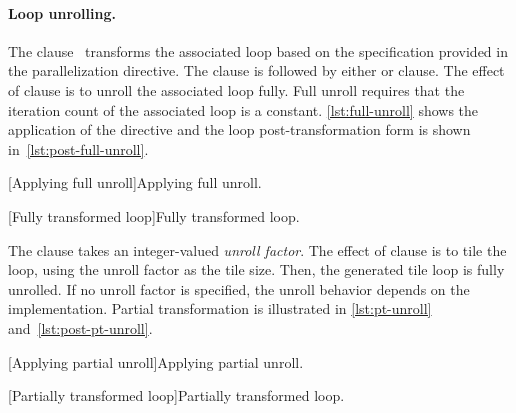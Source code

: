 \paragraph*{Loop unrolling.}
The  clause~\cite[p. 381--382]{openmp_api}
transforms the associated loop based on the specification provided in the parallelization directive.
The  clause is followed by either  or  clause.
The effect of  clause is to unroll the associated loop fully.
Full unroll requires that the iteration count of the associated loop is a constant.
\autoref{lst:full-unroll} shows the application of the directive and the loop post-transformation form is shown in~\autoref{lst:post-full-unroll}.

\begin{center}
\begin{minipage}{\textwidth}
\captionsetup{type=lstlisting}
\begin{minipage}{.45\textwidth}
[Applying full unroll]{Applying full unroll.}
\label{lst:full-unroll}
\end{minipage}\hfill%
\begin{minipage}{.45\textwidth}
[Fully transformed loop]{Fully transformed loop.}
\label{lst:post-full-unroll}
\end{minipage}
\end{minipage}
\end{center}

The  clause takes an integer-valued \emph{unroll factor}.
The effect of  clause is to tile the loop, using the unroll factor as the tile size.
Then, the generated tile loop is fully unrolled.
If no unroll factor is specified, the unroll behavior depends on the implementation.
Partial transformation is illustrated in \autoref{lst:pt-unroll} and~\autoref{lst:post-pt-unroll}.

\begin{center}
\begin{minipage}{\textwidth}
\captionsetup{type=lstlisting}
\begin{minipage}{.45\textwidth}
[Applying partial unroll]{Applying partial unroll.}
\label{lst:pt-unroll}
\end{minipage}\hfill%
\begin{minipage}{.45\textwidth}
[Partially transformed loop]{Partially transformed loop.}
\label{lst:post-pt-unroll}
\end{minipage}
\end{minipage}
\end{center}

